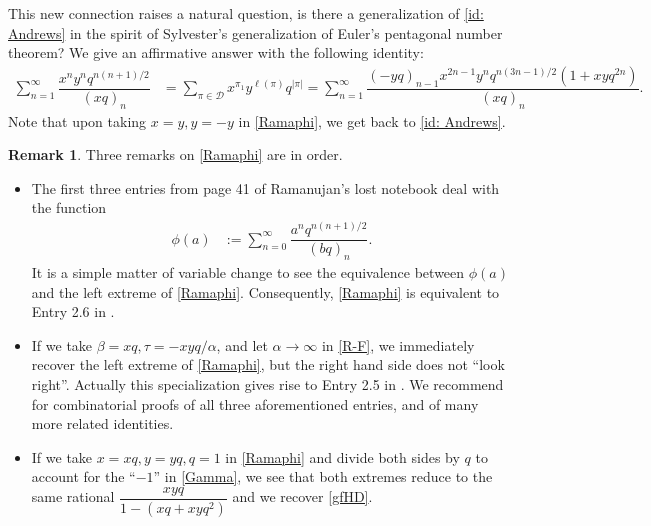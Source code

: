 \documentclass[12pt]{amsart}
\numberwithin{equation}{section}
\theoremstyle{plain}
\theoremstyle{definition}
\newtheorem{remark}[theorem]{Remark}
\def\D{\mathcal{D}}
\begin{document}
This new connection raises a natural question, is there a generalization of \eqref{id: Andrews} in the spirit of Sylvester's generalization \cite[(3.3)]{Andr3} of Euler's pentagonal number theorem? We give an affirmative answer with the following identity:
\begin{align}\label{Ramaphi}
\sum\limits_{n=1}^{\infty}\dfrac{x^ny^nq^{n(n+1)/2}}{(xq)_n}&=
\sum\limits_{\pi\in\D}x^{\pi_1}y^{\ell(\pi)}q^{|\pi|}=
\sum\limits_{n=1}^{\infty}\dfrac{(-yq)_{n-1}x^{2n-1}y^nq^{n(3n-1)/2}(1+xyq^{2n})}{(xq)_{n}}.
\end{align}
Note that upon taking $x=y, y=-y$ in \eqref{Ramaphi}, we get back to \eqref{id: Andrews}.
\begin{remark}
Three remarks on \eqref{Ramaphi} are in order.
\begin{itemize}
\item The first three entries from page 41 of Ramanujan's lost notebook \cite{Rama} deal with the function
\begin{align*}
\phi(a)&:=\sum_{n=0}^{\infty}\dfrac{a^nq^{n(n+1)/2}}{(bq)_n}.
\end{align*}
It is a simple matter of variable change to see the equivalence between $\phi(a)$ and the left extreme of \eqref{Ramaphi}. Consequently, \eqref{Ramaphi} is equivalent to Entry 2.6 in \cite{Rama}.
\item If we take $\beta=xq, \tau=-xyq/\alpha$, and let $\alpha\rightarrow \infty$ in \eqref{R-F}, we immediately recover the left extreme of \eqref{Ramaphi}, but the right hand side does not ``look right''. Actually this specialization gives rise to Entry 2.5 in \cite{Rama}. We recommend \cite{BY} for combinatorial proofs of all three aforementioned entries, and of many more related identities.
\item If we take $x=xq,y=yq,q=1$ in \eqref{Ramaphi} and divide both sides by $q$ to account for the ``$-1$'' in \eqref{Gamma}, we see that both extremes reduce to the same rational $\dfrac{xyq}{1-(xq+xyq^2)}$ and we recover \eqref{gfHD}.
\end{itemize}
\end{remark}



\end{document}
